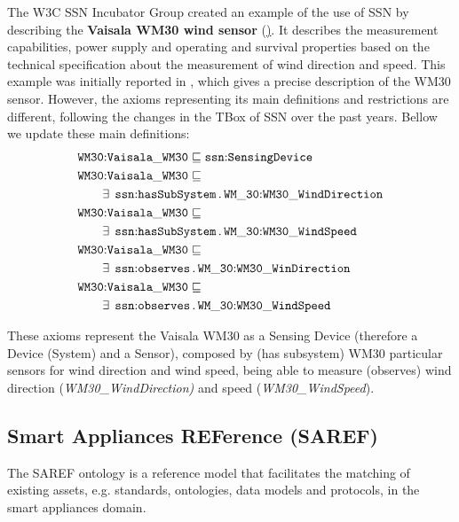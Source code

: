 \documentclass{sig-alternate-05-2015}
\newcommand{\erestr}[2]{\exists\;\,{\tt #1}\,.\,{\tt #2}}
\begin{document}
The W3C SSN Incubator Group created an example of the use of SSN by describing the \textbf{Vaisala WM30 wind sensor} (\href{https://www.w3.org/2005/Incubator/ssn/ssnx/meteo/WM30.html}). It describes the measurement capabilities, power supply and operating and survival properties based on the technical specification about the measurement of wind direction and speed. This example was initially reported in \cite{Compton2009}, which gives a precise description of the WM30 sensor. However, the axioms representing its main definitions and restrictions are different, following the changes in the TBox of SSN over the past years. Bellow we update these main definitions:
\begin{align*}
  \begin{aligned}
	&\node{WM30}{Vaisala\_WM30} \sqsubseteq \node{ssn}{SensingDevice}\\
	&\node{WM30}{Vaisala\_WM30} \sqsubseteq\\
	&\qquad\erestr{\node{ssn}{hasSubSystem}}{\node{WM\_30}{WM30\_WindDirection}}\\
	&\node{WM30}{Vaisala\_WM30} \sqsubseteq\\
	&\qquad\erestr{\node{ssn}{hasSubSystem}}{\node{WM\_30}{WM30\_WindSpeed}}\\	
	&\node{WM30}{Vaisala\_WM30} \sqsubseteq\\
	&\qquad\erestr{\node{ssn}{observes}}{\node{WM\_30}{WM30\_WinDirection}}\\
	&\node{WM30}{Vaisala\_WM30} \sqsubseteq\\
	&\qquad\erestr{\node{ssn}{observes}}{\node{WM\_30}{WM30\_WindSpeed}}\\
  \end{aligned}\\
\end{align*}

These axioms represent the Vaisala WM30 as a Sensing Device (therefore a Device (System) and a Sensor), composed by (has subsystem) WM30 particular sensors for wind direction and wind speed, being able to measure (observes) wind direction (\textit{WM30\_WindDirection)} and speed (\textit{WM30\_WindSpeed}). 

\subsection{Smart Appliances REFerence (SAREF)}
The SAREF ontology \cite{Daniele2015,Daniele2016} is a reference model that facilitates the matching of existing assets, e.g. standards, ontologies, data models and protocols, in the smart appliances domain. 
\end{document}
